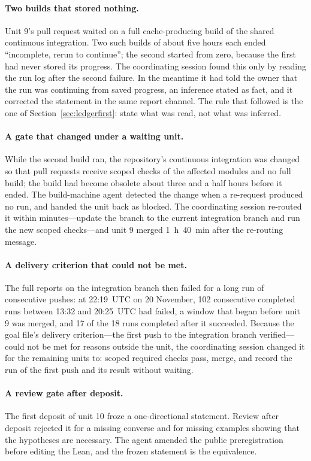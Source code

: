 \documentclass[11pt]{article}
\begin{document}
\paragraph{Two builds that stored nothing.} Unit 9's pull request waited on a
full cache-producing build of the shared continuous integration. Two such
builds of about five hours each ended ``incomplete, rerun to continue''; the
second started from zero, because the first had never stored its progress.
The coordinating session found this only by reading the run log after the
second failure. In the meantime it had told the owner that the run was
continuing from saved progress, an inference stated as fact, and it corrected
the statement in the same report channel. The rule that followed is the one
of Section~\ref{sec:ledgerfirst}: state what was read, not what was inferred.

\paragraph{A gate that changed under a waiting unit.} While the second build
ran, the repository's continuous integration was changed so that pull
requests receive scoped checks of the affected modules and no full build;
the build had become obsolete about three and a half hours before it ended.
The build-machine agent detected the change when a re-request produced no
run, and handed the unit back as blocked. The coordinating session
re-routed it within minutes---update the branch to the current integration
branch and run the new scoped checks---and unit 9 merged 1~h~40~min after
the re-routing message.

\paragraph{A delivery criterion that could not be met.} The full reports on
the integration branch then failed for a long run of consecutive pushes: at
22:19~UTC on 20 November, 102 consecutive completed runs between 13:32 and
20:25~UTC had failed, a window that began before unit 9 was merged, and 17 of
the 18 runs completed after it succeeded. Because the goal file's delivery
criterion---the first push to the integration branch verified---could not be
met for reasons outside the unit, the coordinating session changed it for the
remaining units to: scoped required checks pass, merge, and record the run of
the first push and its result without waiting.

\paragraph{A review gate after deposit.} The first deposit of unit 10 froze a
one-directional statement. Review after deposit rejected it for a missing
converse and for missing examples showing that the hypotheses are necessary.
The agent amended the public preregistration before editing the Lean, and the
frozen statement is the equivalence.
\end{document}

